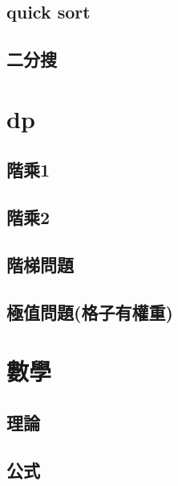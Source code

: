     \subsection{quick sort}
        
    \subsection{二分搜}
        
\section{dp}
    \subsection{階乘1}
        
    \subsection{階乘2}
        
    \subsection{階梯問題}
        
     \subsection{極值問題(格子有權重)}
        
\section{數學}
    \subsection{理論}
        
    \subsection{公式}
        

